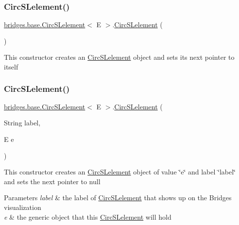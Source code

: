 \subsubsection{\texorpdfstring{Circ\+S\+Lelement()}{CircSLelement()}\hspace{0.1cm}{\footnotesize\ttfamily [1/4]}}
{\footnotesize\ttfamily \hyperlink{classbridges_1_1base_1_1_circ_s_lelement}{bridges.\+base.\+Circ\+S\+Lelement}$<$ E $>$.\hyperlink{classbridges_1_1base_1_1_circ_s_lelement}{Circ\+S\+Lelement} (\begin{DoxyParamCaption}{ }\end{DoxyParamCaption})}

This constructor creates an \hyperlink{classbridges_1_1base_1_1_circ_s_lelement}{Circ\+S\+Lelement} object and sets its next pointer to itself \hypertarget{classbridges_1_1base_1_1_circ_s_lelement_a213d61713e51295d756669def911f080}{}\label{classbridges_1_1base_1_1_circ_s_lelement_a213d61713e51295d756669def911f080} 
\subsubsection{\texorpdfstring{Circ\+S\+Lelement()}{CircSLelement()}\hspace{0.1cm}{\footnotesize\ttfamily [2/4]}}
{\footnotesize\ttfamily \hyperlink{classbridges_1_1base_1_1_circ_s_lelement}{bridges.\+base.\+Circ\+S\+Lelement}$<$ E $>$.\hyperlink{classbridges_1_1base_1_1_circ_s_lelement}{Circ\+S\+Lelement} (\begin{DoxyParamCaption}\item[{String}]{label,  }\item[{E}]{e }\end{DoxyParamCaption})}

This constructor creates an \hyperlink{classbridges_1_1base_1_1_circ_s_lelement}{Circ\+S\+Lelement} object of value \char`\"{}e\char`\"{} and label \char`\"{}label\char`\"{} and sets the next pointer to null


\begin{DoxyParams}{Parameters}
{\em label} & the label of \hyperlink{classbridges_1_1base_1_1_circ_s_lelement}{Circ\+S\+Lelement} that shows up on the Bridges visualization \\
\hline
{\em e} & the generic object that this \hyperlink{classbridges_1_1base_1_1_circ_s_lelement}{Circ\+S\+Lelement} will hold \\
\hline
\end{DoxyParams}
\hypertarget{classbridges_1_1base_1_1_circ_s_lelement_ada65c593c8af7e6ed96fcdf12c26824f}{}\label{classbridges_1_1base_1_1_circ_s_lelement_ada65c593c8af7e6ed96fcdf12c26824f} 
